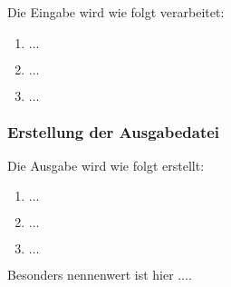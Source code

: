 Die Eingabe wird wie folgt verarbeitet:

\begin{enumerate}
    \item $\ldots$
    \item $\ldots$
    \item $\ldots$
\end{enumerate}

\subsubsection{Erstellung der Ausgabedatei}
\label{sssec:erstellung_der_ausgabedatei}

Die Ausgabe wird wie folgt erstellt:

\begin{enumerate}
    \item $\ldots$
    \item $\ldots$
    \item $\ldots$
\end{enumerate}

Besonders nennenwert ist hier $\ldots$.
